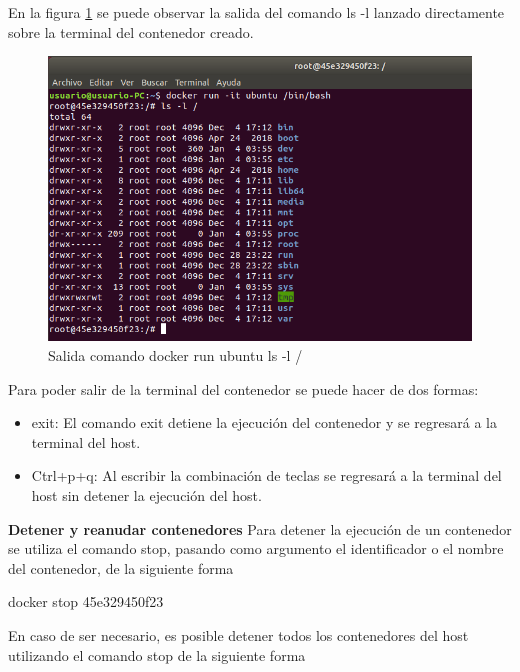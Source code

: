 En la figura \ref{fig:DockerGestion9} se puede observar la salida del comando ls -l lanzado directamente sobre la terminal del contenedor creado.

\begin{figure}[!hbtp]
	\centering
	\includegraphics[width=\linewidth]{Trabajo/RecursosEducativos/RE05_Docker/Gestion_basica/REDocker_Gestion9.png}
	\vspace{-0.2cm}
	\caption{Salida comando docker run ubuntu ls -l /}
	\label{fig:DockerGestion9}
\end{figure}

Para poder salir de la terminal del contenedor se puede hacer de dos formas:
\begin{itemize}
    \item exit: El comando exit detiene la ejecución del contenedor y se regresará a la terminal del host.
    \item Ctrl+p+q: Al escribir la combinación de teclas se regresará a la terminal del host sin detener la ejecución del host.
\end{itemize}
\textbf{Detener y reanudar contenedores}
Para detener la ejecución de un contenedor se utiliza el comando stop, pasando como argumento el identificador o el nombre del contenedor, de la siguiente forma

\begin{commandshell} docker stop 45e329450f23 \end{commandshell}

En caso de ser necesario, es posible detener todos los contenedores del host utilizando el comando stop de la siguiente forma

